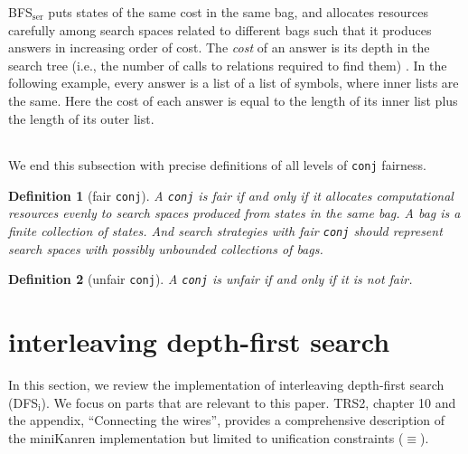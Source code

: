 \documentclass[format=acmlarge, review=true, authordraft=true]{acmart}
\newcommand{\conj}{\texttt{conj}}
\newcommand{\DFSi }[0]{DFS$_\textrm{i}$}
\newcommand{\BFSser}[0]{BFS$_\textrm{ser}$}
\newtheorem{defn}{Definition}[section]
\begin{document}
\BFSser{} puts states of the same cost in the same bag, and allocates
resources carefully among search spaces related to different bags such
that it produces answers in increasing order of cost. The \emph{cost}
of an answer is its depth in the search tree (i.e., the number of
calls to relations required to find them) \citep{seres1999algebra}. In
the following example, every answer is a list of a list of symbols,
where inner lists are the same. Here the cost of each answer is equal
to the length of its inner list plus the length of its outer list.


\begin{center}
	\begin{tabular}{c}
		
	\end{tabular}
\end{center}

We end this subsection with precise definitions of all levels of \conj{} 
fairness.

\begin{defn}[fair \conj{}]
A \conj{} is fair if and only if it allocates computational resources evenly to 
search spaces produced from states in the same bag. A bag is a finite 
collection of states. And search strategies with fair \conj{} should represent 
search spaces with possibly unbounded collections of bags. 
\end{defn}

\begin{defn}[unfair \conj{}]
A \conj{} is unfair if and only if it is not fair.
\end{defn}





\section{interleaving depth-first search}

In this section, we review the implementation of interleaving depth-first 
search (\DFSi). We focus on parts that are relevant to this paper. TRS2,
chapter 10 and the appendix, ``Connecting the wires'', 
provides a comprehensive description of the 
miniKanren 
implementation but limited to unification constraints ($\equiv$).
\end{document}
